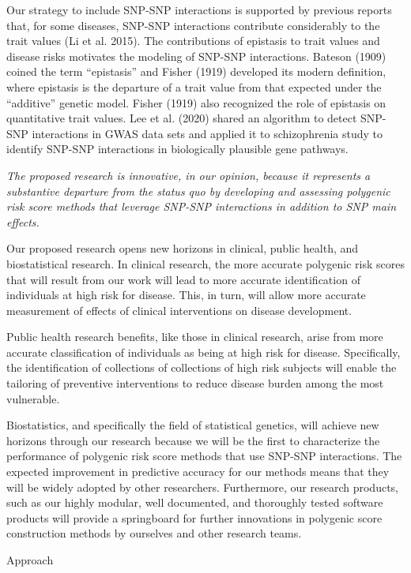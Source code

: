 \documentclass[
  11pt,
  letterpaper,
  DIV=11,
  numbers=noendperiod]{scrartcl}
\begin{document}
Our strategy to include SNP-SNP interactions is supported by previous
reports that, for some diseases, SNP-SNP interactions contribute
considerably to the trait values (Li et al. 2015). The contributions of
epistasis to trait values and disease risks motivates the modeling of
SNP-SNP interactions. Bateson (1909) coined the term ``epistasis'' and
Fisher (1919) developed its modern definition, where epistasis is the
departure of a trait value from that expected under the ``additive''
genetic model. Fisher (1919) also recognized the role of epistasis on
quantitative trait values. Lee et al. (2020) shared an algorithm to
detect SNP-SNP interactions in GWAS data sets and applied it to
schizophrenia study to identify SNP-SNP interactions in biologically
plausible gene pathways.

\emph{The proposed research is innovative, in our opinion, because it
represents a substantive departure from the status quo by developing and
assessing polygenic risk score methods that leverage SNP-SNP
interactions in addition to SNP main effects.}

Our proposed research opens new horizons in clinical, public health, and
biostatistical research. In clinical research, the more accurate
polygenic risk scores that will result from our work will lead to more
accurate identification of individuals at high risk for disease. This,
in turn, will allow more accurate measurement of effects of clinical
interventions on disease development.

Public health research benefits, like those in clinical research, arise
from more accurate classification of individuals as being at high risk
for disease. Specifically, the identification of collections of
collections of high risk subjects will enable the tailoring of
preventive interventions to reduce disease burden among the most
vulnerable.

Biostatistics, and specifically the field of statistical genetics, will
achieve new horizons through our research because we will be the first
to characterize the performance of polygenic risk score methods that use
SNP-SNP interactions. The expected improvement in predictive accuracy
for our methods means that they will be widely adopted by other
researchers. Furthermore, our research products, such as our highly
modular, well documented, and thoroughly tested software products will
provide a springboard for further innovations in polygenic score
construction methods by ourselves and other research teams.

Approach
\end{document}
